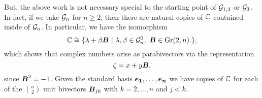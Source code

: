 But, the above work is not necessary special to the starting point of $\mathcal{G}_{1,3}$ or $\mathcal{G}_3$. In fact, if we take $\mathcal{G}_n$ for $n\geq 2$, then there are natural copies of $\mathbb{C}$ contained inside of $\mathcal{G}_n$. In particular, we have the isomorphism
\begin{equation}
    \mathbb{C} \cong \{\lambda + \beta \boldsymbol{B} ~\vert~ \lambda,\beta \in \mathcal{G}_n^0,~ \boldsymbol{B} \in \operatorname{Gr}(2,n). \},
\end{equation}
which shows that complex numbers arise as parabivectors via the representation
\begin{equation}
        \zeta = x + y\boldsymbol{B},
\end{equation}
since $\boldsymbol{B}^2=-1$. Given the standard basis $\boldsymbol{e_1},\dots,\boldsymbol{e_n}$ we have copies of $\mathbb{C}$ for each of the ${ n \choose 2}$ unit bivectors $\boldsymbol{B}_{jk}$ with $k=2,\dots,n$ and $j<k$.




